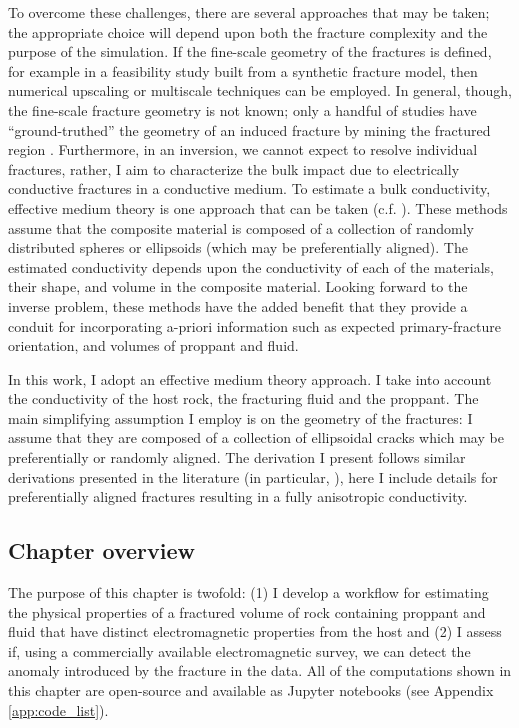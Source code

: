 To overcome these challenges, there are several approaches that may be taken; the appropriate choice will depend upon both the fracture complexity and the purpose of the simulation. If the fine-scale geometry of the fractures is defined, for example in a feasibility study built from a synthetic fracture model, then numerical upscaling \citep{Durlofsky2003, CaudilloMata2014, CaudilloMata2016} or multiscale techniques \citep{Haber2014} can be employed. In general, though, the fine-scale fracture geometry is not known; only a handful of studies have ``ground-truthed'' the geometry of an induced fracture by mining the fractured region \citep{Cipolla2008a}. Furthermore, in an inversion, we cannot expect to resolve individual fractures, rather, I aim to characterize the bulk impact due to electrically conductive fractures in a conductive medium. To estimate a bulk conductivity, effective medium theory is one approach that can be taken (c.f. \cite{Torquato2002, Milton2002, Berryman2013}). These methods assume that the composite material is composed of a collection of randomly distributed spheres or ellipsoids (which may be preferentially aligned). The estimated conductivity depends upon the conductivity of each of the materials, their shape, and volume in the composite material. Looking forward to the inverse problem, these methods have the added benefit that they provide a conduit for incorporating a-priori information such as expected primary-fracture orientation, and volumes of proppant and fluid.

In this work, I adopt an effective medium theory approach. I take into account the conductivity of the host rock, the fracturing fluid and the proppant. The main simplifying assumption I employ is on the geometry of the fractures: I assume that they are composed of a collection of ellipsoidal cracks which may be preferentially or randomly aligned. The derivation I present follows similar derivations presented in the literature (in particular, \cite{Torquato2002}), here I include details for preferentially aligned fractures resulting in a fully anisotropic conductivity.
\subsection{Chapter overview}
The purpose of this chapter is twofold: (1) I develop a workflow for estimating the physical properties of a fractured volume of rock containing proppant and fluid that have distinct electromagnetic properties from the host and (2) I assess if, using a commercially available electromagnetic survey, we can detect the anomaly introduced by the fracture in the data. All of the computations shown in this chapter are open-source and available as Jupyter notebooks (see Appendix \ref{app:code_list}).

